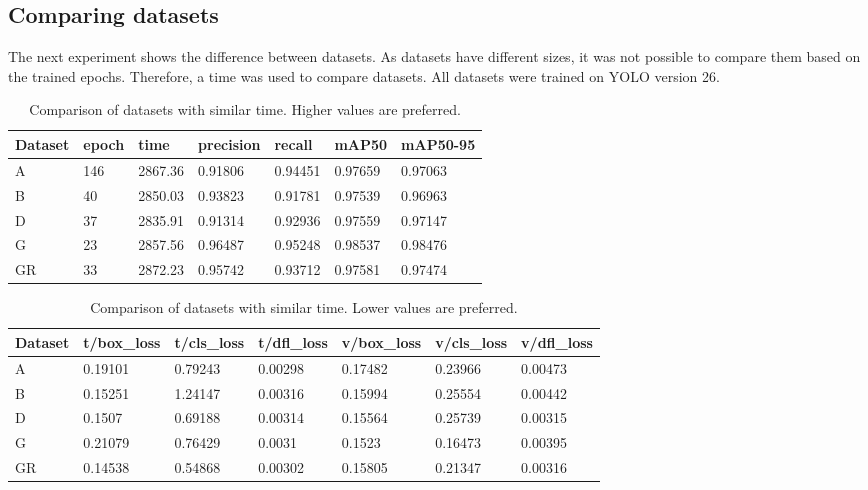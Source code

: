 \subsection{Comparing datasets}
The next experiment shows the difference between datasets. As datasets have different sizes, it was not possible to compare them based on the trained epochs. Therefore, a time was used to compare datasets. All datasets were trained on YOLO version 26.

\begin{table}[hbt]
\centering
\caption{Comparison of datasets with similar time. Higher values are preferred.}
\label{expDatasetComparison1}
\begin{tabular}{|l|l|l|l|l|l|l|}
\hline
Dataset & epoch & time & precision & recall & mAP50 & mAP50-95 \\ \hline
A  & 146 & 2867.36 & 0.91806 & 0.94451 & 0.97659 & 0.97063 \\ \hline
B  & 40  & 2850.03 & 0.93823 & 0.91781 & 0.97539 & 0.96963 \\ \hline
D  & 37  & 2835.91 & 0.91314 & 0.92936 & 0.97559 & 0.97147 \\ \hline
G  & 23  & 2857.56 & 0.96487 & 0.95248 & 0.98537 & 0.98476 \\ \hline
GR & 33  & 2872.23 & 0.95742 & 0.93712 & 0.97581 & 0.97474 \\ \hline
\end{tabular}
\end{table}

\begin{table}[hbt]
\centering
\label{expDatasetComparison2}
\caption{Comparison of datasets with similar time. Lower values are preferred.}
\begin{tabular}{|l|l|l|l|l|l|l|}
\hline
Dataset & t/box\_loss & t/cls\_loss & t/dfl\_loss & v/box\_loss & v/cls\_loss & v/dfl\_loss \\ \hline
A         & 0.19101 & 0.79243 & 0.00298 & 0.17482 & 0.23966 & 0.00473 \\ \hline
B         & 0.15251 & 1.24147 & 0.00316 & 0.15994 & 0.25554 & 0.00442 \\ \hline
D         & 0.1507  & 0.69188 & 0.00314 & 0.15564 & 0.25739 & 0.00315 \\ \hline
G         & 0.21079 & 0.76429 & 0.0031  & 0.1523  & 0.16473 & 0.00395 \\ \hline
GR        & 0.14538 & 0.54868 & 0.00302 & 0.15805 & 0.21347 & 0.00316 \\ \hline
\end{tabular}
\end{table}

